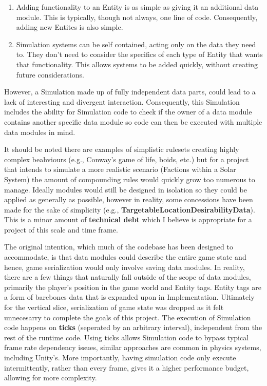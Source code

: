 \documentclass{report}
\begin{document}
\begin{enumerate}

	\item Adding functionality to an Entity is as simple as giving it an additional data module. This is typically, though not always, one line of code. Consequently, adding new Entites is also simple.

	\item Simulation systems can be self contained, acting only on the data they need to. They don't need to consider the specifics of each type of Entity that wants that functionality. This allows systems to be added quickly, without creating future considerations.

\end{enumerate}

However, a Simulation made up of fully independent data parts, could lead to a lack of interesting and divergent interaction. Consequently, this Simulation includes the ability for Simulation code to check if the owner of a data module contains another specific data module so code can then be executed with multiple data modules in mind. 

It should be noted there are examples of simplistic rulesets creating highly complex beahviours (e.g., Conway's game of life, boids, etc.) but for a project that intends to simulate a more realistic scenario (Factions within a Solar System) the amount of compounding rules would quickly grow too numerous to manage. Ideally modules would still be designed in isolation so they could be applied as generally as possible, however in reality, some concessions have been made for the sake of simplicity (e.g., \textbf{TargetableLocationDesirabilityData}). This is a minor amount of \textbf{technical debt} which I believe is appropriate for a project of this scale and time frame.

The original intention, which much of the codebase has been designed to accommodate, is that data modules could describe the entire game state and hence, game serialization would only involve saving data modules. In reality, there are a few things that naturally fall outside of the scope of data modules, primarily the player's position in the game world and Entity tags. Entity tags are a form of barebones data that is expanded upon in Implementation. Ultimately for the vertical slice, serialization of game state was dropped as it felt unnecesarry to complete the goals of this project.
\newline
\newline
The execution of Simulation code happens on \textbf{ticks} (seperated by an arbitrary interval), independent from the rest of the runtime code. Using ticks allows Simulation code to bypass typical frame rate dependency issues, similar approaches are common in physics systems, including Unity's. More importantly, having simulation code only execute intermittently, rather than every frame, gives it a higher performance budget, allowing for more complexity.
\end{document}
